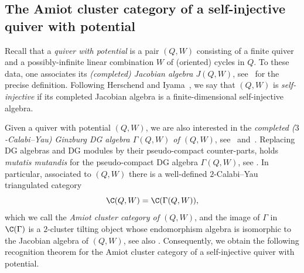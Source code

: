 \documentclass[a4paper]{amsart}
\begin{document}
\subsection{The Amiot cluster category of a self-injective quiver with
  potential}

Recall that a \emph{quiver with potential} is a pair $(Q,W)$ consisting of a
finite quiver and a possibly-infinite linear combination $W$ of (oriented)
cycles in $Q$. To these data, one associates its \emph{(completed) Jacobian
  algebra $J(Q,W)$}, see~\cite[Def.~3.1]{DWZ08} for the precise definition.
Following Herschend and Iyama~\cite{HI11}, we say that $(Q,W)$ is
\emph{self-injective} if its completed Jacobian algebra is a finite-dimensional
self-injective algebra.

Given a quiver with potential $(Q,W)$, we are also interested in the
\emph{completed ($3$-Calabi--Yau) Ginzburg DG algebra $\Gamma(Q,W)$ of $(Q,W)$},
see~\cite{Gin06} and~\cite[Sec.~2.6]{KY11}. Replacing DG algebras and DG modules
by their pseudo-compact counter-parts,  holds \emph{mutatis
  mutandis} for the pseudo-compact DG algebra $\Gamma(Q,W)$, see
\cite[Thm.~A.27]{KY11}. In particular, associated to $(Q,W)$ there is a
well-defined $2$-Calabi--Yau triangulated category
\[
  \C(Q,W)=\C(\Gamma(Q,W)),
\]
which we call the \emph{Amiot cluster category of $(Q,W)$}, and the image of
$\Gamma$ in $\C(\Gamma)$ is a $2$-cluster tilting object whose endomorphism
algebra is isomorphic to the Jacobian algebra of $(Q,W)$, see also
\cite{Ami09}. Consequently, we obtain the following recognition theorem for the
Amiot cluster category of a self-injective quiver with potential.
\end{document}
